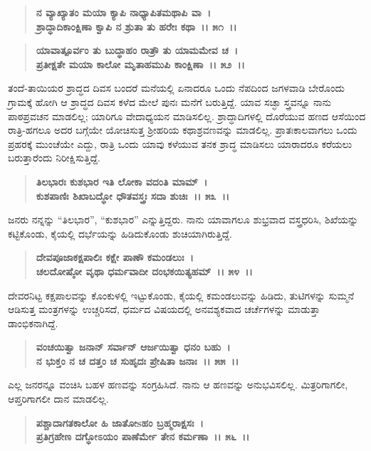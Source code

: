 \begin{verse}
\textbf{ನ ವ್ಯಾಖ್ಯಾತಂ ಮಯಾ ಕ್ಯಾಪಿ ನಾಧ್ಯಾಪಿತಮಥಾಪಿ ವಾ~।}\\\textbf{ಶ್ರಾದ್ಧಾದಿಕಾಂಕ್ಷಿಣಾ ಕ್ವಾಪಿ ನ ಶ್ರುತಾ ತು ಹರೇಃ ಕಥಾ~।। ೫೧~।। }
\end{verse}

\begin{verse}
\textbf{ಯಾವಾತ್ಪೂರ್ವಂ ತು ಬುದ್ಧಾಹಂ ರಾತ್ರೌ ತು ಯಾಮಮೇವ ಚ~।}\\\textbf{ಪ್ರತೀಕ್ಷತೇ ಮಯಾ ಕಾಲೋ ಮೃತಾಹಮುಪಿ ಕಾಂಕ್ಷಿಣಾ~।। ೫೨~।।}
\end{verse}

ತಂದೆ-ತಾಯಿಯರ ಶ್ರಾದ್ಧದ ದಿವಸ ಬಂದರೆ ಮನೆಯಲ್ಲಿ ಏನಾದರೂ ಒಂದು ನೆಪದಿಂದ ಜಗಳವಾಡಿ ಬೇರೊಂದು ಗ್ರಾಮಕ್ಕೆ ಹೋಗಿ ಆ ಶ್ರಾದ್ಧದ ದಿವಸ ಕಳೆದ ಮೇಲೆ ಪುನಃ ಮನೆಗೆ ಬರುತ್ತಿದ್ದೆ. ಯಾವ ಸಚ್ಛಾ ಸ್ತ್ರವನ್ನೂ ನಾನು ಪಾಠಪ್ರವಚನ ಮಾಡಲಿಲ್ಲ; ಯಾರಿಗೂ ವೇದಾಧ್ಯಯನ ಮಾಡಿಸಲಿಲ್ಲ. ಶ್ರಾದ್ಧಾದಿಗಳಲ್ಲಿ ದೊರೆಯುವ ಹಣದ ಆಸೆಯಿಂದ ರಾತ್ರಿ-ಹಗಲೂ ಅದರ ಬಗ್ಗೆಯೇ ಯೋಚಿಸುತ್ತ ಶ‍್ರೀಹರಿಯ ಕಥಾಶ್ರವಣವನ್ನು ಮಾಡಲಿಲ್ಲ. ಪ್ರಾತಃಕಾಲವಾಗಲು ಒಂದು ಪ್ರಹರಕ್ಕೆ ಮುಂಚೆಯೇ ಎದ್ದು, ರಾತ್ರಿ ಒಂದು ಯಾವು ಕಳೆಯುವ ತನಕ ಶ್ರಾದ್ಧ ಮಾಡಿಸಲು ಯಾರಾದರೂ ಕರೆಯಲು ಬರುತ್ತಾರೆಂದು ನಿರೀಕ್ಷಿಸುತ್ತಿದ್ದೆ.

\begin{verse}
\textbf{ತಿಲಭಾರಃ ಕುಶಭಾರ ಇತಿ ಲೋಕಾ ವದಂತಿ ಮಾಮ್~।}\\\textbf{ಕುಶಪಾಣಿಃ ಶಿಖಾಬದ್ಧೋ ಧೌತವಸ್ತ್ರಃ ಸದಾ ಶುಚಿಃ~।। ೫೩~।।}
\end{verse}

ಜನರು ನನ್ನನ್ನು “ತಿಲಭಾರ”, “ಕುಶಭಾರ” ಎನ್ನುತ್ತಿದ್ದರು. ನಾನು ಯಾವಾಗಲೂ ಶುಭ್ರವಾದ ವಸ್ತ್ರಧರಿಸಿ, ಶಿಖೆಯನ್ನು ಕಟ್ಟಿಕೊಂಡು, ಕೈಯಲ್ಲಿ ದರ್ಭೆಯನ್ನು ಹಿಡಿದುಕೊಂಡು ಶುಚಿಯಾಗಿರುತ್ತಿದ್ದೆ.

\begin{verse}
\textbf{ದೇವಪೂಜಾಕಕ್ಷಪಾಲಿಃ ಕಕ್ಷೇ ಪಾಣೌ ಕಮಂಡಲುಃ~।}\\\textbf{ಚಲದೋಷ್ಠೋ ವೃಥಾ ಧರ್ಮವಾದೀ ದಂಭಕಯಿತ್ಯಹಮ್~।। ೫೪~।।}
\end{verse}

ದೇವರನಿಟ್ಟ ಕಕ್ಷಪಾಲವನ್ನು ಕೊಂಕುಳಲ್ಲಿ ಇಟ್ಟುಕೊಂಡು, ಕೈಯಲ್ಲಿ ಕಮಂಡಲುವನ್ನು ಹಿಡಿದು, ತುಟಿಗಳನ್ನು ಸುಮ್ಮನೆ ಆಡಿಸುತ್ತ ಮಂತ್ರಗಳನ್ನು ಉಚ್ಚರಿಸದೆ, ಧರ್ಮದ ವಿಷಯದಲ್ಲಿ ಅನವಶ್ಯಕವಾದ ಚರ್ಚೆಗಳನ್ನು ಮಾಡುತ್ತಾ ಡಾಂಭಿಕನಾಗಿದ್ದೆ.

\begin{verse}
\textbf{ವಂಚಯಿತ್ವಾ ಜನಾನ್ ಸರ್ವಾನ್ ಆರ್ಜಯಿತ್ವಾ ಧನಂ ಬಹು~।}\\\textbf{ನ ಭುಕ್ತಂ ನ ಚ ದತ್ತಂ ಚ ಸುಹೃದಃ ಪ್ರೇಷಿತಾ ಜನಾಃ~।। ೫೫~।।}
\end{verse}

ಎಲ್ಲ ಜನರನ್ನೂ ವಂಚಿಸಿ ಬಹಳ ಹಣವನ್ನು ಸಂಗ್ರಹಿಸಿದೆ. ನಾನು ಆ ಹಣವನ್ನು ಅನುಭವಿಸಲಿಲ್ಲ. ಮಿತ್ರರಿಗಾಗಲೀ, ಆಪ್ತರಿಗಾಗಲೀ ದಾನ ಮಾಡಲಿಲ್ಲ.

\begin{verse}
\textbf{ಪಶ್ಚಾದಾಗತಕಾಲೋ ಹಿ ಜಾತೋsಹಂ ಬ್ರಹ್ಮರಾಕ್ಷಸಃ~।}\\\textbf{ಪ್ರತಿಗ್ರಹೇಣ ದಗ್ಧೋಽಯಂ ಪಾಣೆರ್ಮೇ ತೇನ ಕರ್ಮಣಾ~।। ೫೬~।।} 
\end{verse}

